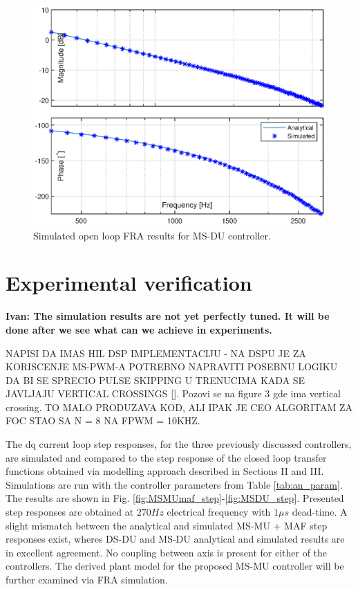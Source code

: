 \documentclass[journal]{IEEEtran}
\begin{document}
\begin{figure}[t!]
    \centerline{\includegraphics[width=0.95\linewidth]{figures/MSDU_olfra.eps}}
    \caption{Simulated open loop FRA results for MS-DU controller.}
    \label{fig:MSDU_olfra} 
\end{figure}

\section{Experimental verification}
\textbf{Ivan: The simulation results are not yet perfectly tuned. It will be done after we see what can we achieve in experiments.}

NAPISI DA IMAS HIL DSP IMPLEMENTACIJU - NA DSPU JE ZA KORISCENJE MS-PWM-A POTREBNO NAPRAVITI POSEBNU LOGIKU DA BI SE SPRECIO PULSE SKIPPING U TRENUCIMA KADA SE JAVLJAJU VERTICAL CROSSINGS []. Pozovi se na figure 3 gde ima vertical crossing. TO MALO PRODUZAVA KOD, ALI IPAK JE CEO ALGORITAM ZA FOC STAO SA N = 8 NA FPWM = 10KHZ. 



The dq current loop step responses, for the three previously discussed controllers, are simulated and compared to the step response of the closed loop transfer functions obtained via modelling approach described in Sections II and III. Simulations are run with the controller parameters from Table \ref{tab:an_param}. The results are shown in Fig. \ref{fig:MSMUmaf_step}-\ref{fig:MSDU_step}. Presented step responses are obtained at $270 Hz$ electrical frequency with $1 \mu s$ dead-time. A slight mismatch between the analytical and simulated MS-MU + MAF step responses exist, wheres DS-DU and MS-DU analytical and simulated results are in excellent agreement. No coupling between axis is present for either of the controllers. The derived plant model for the proposed MS-MU controller will be further examined via FRA simulation. \par
\end{document}
